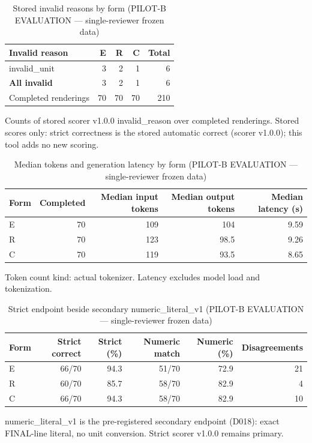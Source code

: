 \begin{table}[t]
\centering
\small
\caption{Stored invalid reasons by form (PILOT-B EVALUATION --- single-reviewer frozen data)}
\label{tab:pilotb-Qwen3-4B-invalid}
\begin{tabular}{lrrrr}
\toprule
Invalid reason & E & R & C & Total \\
\midrule
invalid\_unit & 3 & 2 & 1 & 6 \\
\textbf{All invalid} & 3 & 2 & 1 & 6 \\
Completed renderings & 70 & 70 & 70 & 210 \\
\bottomrule
\end{tabular}
\par\smallskip
\parbox{\linewidth}{\footnotesize Counts of stored scorer v1.0.0 invalid\_reason over completed renderings. Stored scores only: strict correctness is the stored automatic correct (scorer v1.0.0); this tool adds no new scoring.}
\end{table}

\begin{table}[t]
\centering
\small
\caption{Median tokens and generation latency by form (PILOT-B EVALUATION --- single-reviewer frozen data)}
\label{tab:pilotb-Qwen3-4B-resources}
\begin{tabular}{lrrrr}
\toprule
Form & Completed & Median input tokens & Median output tokens & Median latency (s) \\
\midrule
E & 70 & 109 & 104 & 9.59 \\
R & 70 & 123 & 98.5 & 9.26 \\
C & 70 & 119 & 93.5 & 8.65 \\
\bottomrule
\end{tabular}
\par\smallskip
\parbox{\linewidth}{\footnotesize Token count kind: actual tokenizer. Latency excludes model load and tokenization.}
\end{table}

\begin{table}[t]
\centering
\small
\caption{Strict endpoint beside secondary numeric\_literal\_v1 (PILOT-B EVALUATION --- single-reviewer frozen data)}
\label{tab:pilotb-Qwen3-4B-numeric}
\begin{tabular}{lrrrrr}
\toprule
Form & Strict correct & Strict (\%) & Numeric match & Numeric (\%) & Disagreements \\
\midrule
E & 66/70 & 94.3 & 51/70 & 72.9 & 21 \\
R & 60/70 & 85.7 & 58/70 & 82.9 & 4 \\
C & 66/70 & 94.3 & 58/70 & 82.9 & 10 \\
\bottomrule
\end{tabular}
\par\smallskip
\parbox{\linewidth}{\footnotesize numeric\_literal\_v1 is the pre-registered secondary endpoint (D018): exact FINAL-line literal, no unit conversion. Strict scorer v1.0.0 remains primary.}
\end{table}
